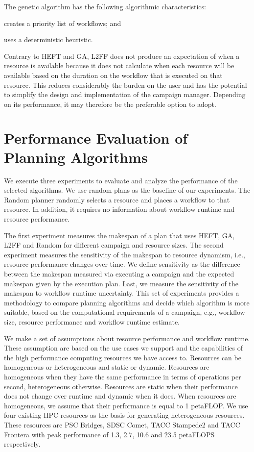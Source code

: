 The genetic algorithm  has the following algorithmic characteristics:
\begin{inparaenum}[(1)]
    \item creates a priority list of workflows; and
    \item uses a deterministic heuristic.
\end{inparaenum}
Contrary to HEFT and GA, L2FF does not produce an expectation of when a resource
is available because it does not calculate when each resource will be available
based on the duration on the workflow that is executed on that resource. This
reduces considerably the burden on the user and has the potential to simplify
the design and implementation of the campaign manager. Depending on its
performance, it may therefore be the preferable option to adopt.

\section{Performance Evaluation of Planning Algorithms}
\label{sec:algo_perf_comp}

We execute three experiments to evaluate and analyze the performance of the
selected algorithms. We use random plans as the baseline of our experiments.
The Random planner randomly selects a resource and places a workflow to that
resource. In addition, it requires no information about workflow runtime and
resource performance.

The first experiment measures the makespan of a plan that uses HEFT, GA, L2FF
and Random for different campaign and resource sizes. The second experiment
measures the sensitivity of the makespan to resource dynamism, i.e., resource
performance changes over time. We define sensitivity as the difference between
the makespan measured via executing a campaign and the expected makespan given
by the execution plan. Last, we measure the sensitivity of the makespan to
workflow runtime uncertainty. This set of experiments provides a methodology to
compare planning algorithms and decide which algorithm is more suitable, based
on the computational requirements of a campaign, e.g., workflow size, resource
performance and workflow runtime estimate.

We make a set of assumptions about resource performance and workflow runtime.
These assumption are based on the use cases we support and the capabilities of
the high performance computing resources we have access to. Resources can be
homogeneous or heterogeneous and static or dynamic. Resources are homogeneous
when they have the same performance in terms of operations per second,
heterogeneous otherwise. Resources are static when their performance does not
change over runtime and dynamic when it does. When resources are homogeneous, we
assume that their performance is equal to 1 petaFLOP. We use four existing HPC
resources as the basis for generating heterogeneous resources. These resources
are PSC Bridges, SDSC Comet, TACC Stampede2 and TACC Frontera with peak
performance of 1.3, 2.7, 10.6 and 23.5 petaFLOPS respectively. 

